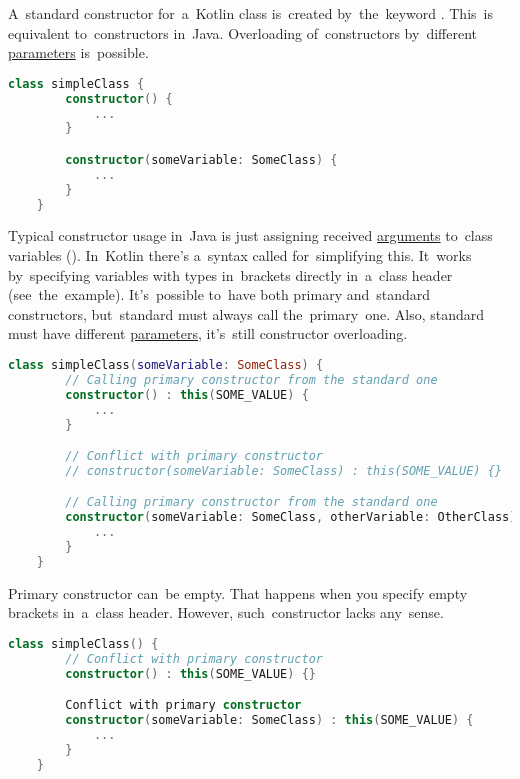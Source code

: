 
\label{kotlinconstructor}
A~standard constructor for~a~Kotlin class is~created by~the~keyword .
This~is equivalent to~constructors in~Java.
Overloading of~constructors by~different \hyperref[parameterargument]{parameters} is~possible.

\begin{lstlisting}[language=Kotlin]
    class simpleClass {
        constructor() {
            ...
        }

        constructor(someVariable: SomeClass) {
            ...
        }
    }
\end{lstlisting}

\label{kotlinprimaryconstructor}
Typical constructor usage in~Java is just assigning received \hyperref[parameterargument]{arguments} to~class variables ().
In~Kotlin there's a~syntax called  for~simplifying this.
It~works by~specifying variables with types in~brackets directly in~a~class header (see~the~example).
It's~possible to~have both primary and~standard constructors, but~standard must always call the~primary~one.
Also, standard must have different \hyperref[parameterargument]{parameters}, it's~still constructor overloading.
\newpage

\begin{lstlisting}[language=Kotlin]
    class simpleClass(someVariable: SomeClass) {
        // Calling primary constructor from the standard one
        constructor() : this(SOME_VALUE) {
            ...
        }

        // Conflict with primary constructor
        // constructor(someVariable: SomeClass) : this(SOME_VALUE) {}

        // Calling primary constructor from the standard one
        constructor(someVariable: SomeClass, otherVariable: OtherClass) : this(SOME_VALUE) {
            ...
        }
    }
\end{lstlisting}

\noindent Primary constructor can~be empty.
That happens when you specify empty brackets in~a~class header.
However, such~constructor lacks any~sense.
\begin{lstlisting}[language=Kotlin]
    class simpleClass() {
        // Conflict with primary constructor
        constructor() : this(SOME_VALUE) {}

        Conflict with primary constructor
        constructor(someVariable: SomeClass) : this(SOME_VALUE) {
            ...
        }
    }
\end{lstlisting}

